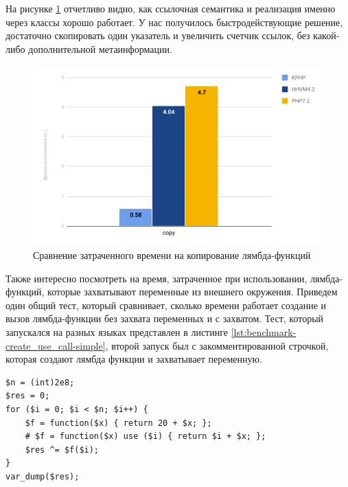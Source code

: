 На рисунке \ref{fig:benchmark-copy-simple} отчетливо видно, как ссылочная семантика и реализация именно через классы хорошо работает.
У нас получилось быстродействующие решение, достаточно скопировать один указатель и увеличить счетчик ссылок, без какой-либо дополнительной метаинформации.
\begin{figure}[H]
    \caption{Сравнение затраченного времени на копирование лямбда-функций}
    \label{fig:benchmark-copy-simple}
    \centering
    \includegraphics[width=\linewidth]{images/benchmark_copy_simple}
\end{figure}

Также интересно посмотреть на время, затраченное при использовании, лямбда-функций, которые захватывают переменные из внешнего окружения.
Приведем один общий тест, который сравнивает, сколько времени работает создание и вызов лямбда-функции без захвата переменных и с захватом.
Тест, который запускался на разных языках представлен в листинге \ref{lst:benchmark-create_use_call-simple}, второй запуск был с закомментированной строчкой, которая создают лямбда функции и захватывает переменную.
\begin{lstlisting}[caption={Бенчмарк создания и вызова анонимных функций с захватом},label={lst:benchmark-create_use_call-simple}]
$n = (int)2e8;
$res = 0;
for ($i = 0; $i < $n; $i++) {
    $f = function($x) { return 20 + $x; };
    # $f = function($x) use ($i) { return $i + $x; };
    $res ^= $f($i);
}
var_dump($res);
\end{lstlisting}

